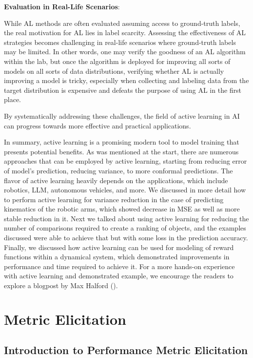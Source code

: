 \documentclass[
  letterpaper,
  numbers=noenddot,
  DIV=11]{scrreprt}
\theoremstyle{plain}
\theoremstyle{definition}
\theoremstyle{plain}
\theoremstyle{remark}
\begin{document}
\textbf{Evaluation in Real-Life Scenarios}:

While AL methods are often evaluated assuming access to ground-truth
labels, the real motivation for AL lies in label scarcity. Assessing the
effectiveness of AL strategies becomes challenging in real-life
scenarios where ground-truth labels may be limited. In other words, one
may verify the goodness of an AL algorithm within the lab, but once the
algorithm is deployed for improving all sorts of models on all sorts of
data distributions, verifying whether AL is actually improving a model
is tricky, especially when collecting and labeling data from the target
distribution is expensive and defeats the purpose of using AL in the
first place.

By systematically addressing these challenges, the field of active
learning in AI can progress towards more effective and practical
applications.

In summary, active learning is a promising modern tool to model training
that presents potential benefits. As was mentioned at the start, there
are numerous approaches that can be employed by active learning,
starting from reducing error of model's prediction, reducing variance,
to more conformal predictions. The flavor of active learning heavily
depends on the applications, which include robotics, LLM, autonomous
vehicles, and more. We discussed in more detail how to perform active
learning for variance reduction in the case of predicting kinematics of
the robotic arms, which showed decrease in MSE as well as more stable
reduction in it. Next we talked about using active learning for reducing
the number of comparisons required to create a ranking of objects, and
the examples discussed were able to achieve that but with some loss in
the prediction accuracy. Finally, we discussed how active learning can
be used for modeling of reward functions within a dynamical system,
which demonstrated improvements in performance and time required to
achieve it. For a more hands-on experience with active learning and
demonstrated example, we encourage the readers to explore a blogpost by
Max Halford ().

\section{Metric Elicitation}\label{sec-metric-elicitation}

\subsection{Introduction to Performance Metric
Elicitation}\label{introduction-to-performance-metric-elicitation}
\end{document}

